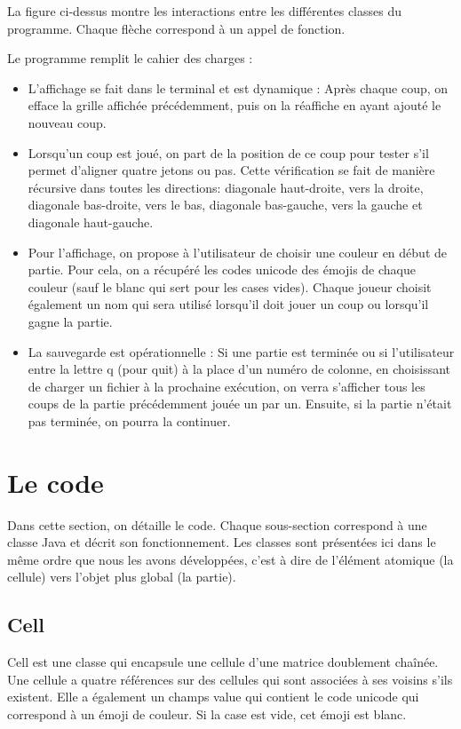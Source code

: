 \documentclass{article}
\begin{document}
La figure ci-dessus montre les interactions entre les différentes classes du programme. Chaque flèche correspond à un appel de
fonction.

Le programme remplit le cahier des charges :

\begin{itemize}
  \item L'affichage se fait dans le terminal et est dynamique :
  Après chaque coup, on efface la grille affichée précédemment, puis on la réaffiche en ayant ajouté le nouveau coup.
  \item Lorsqu'un coup est joué, on part de la position de ce coup pour tester s'il permet d'aligner quatre jetons ou pas. Cette
  vérification se fait de manière récursive dans toutes les directions: diagonale haut-droite, vers la droite, diagonale bas-droite, 
  vers le bas, diagonale bas-gauche, vers la gauche et diagonale haut-gauche.
  \item Pour l'affichage, on propose à l'utilisateur de choisir une couleur en début de partie. Pour cela, on a récupéré les codes
  unicode des émojis de chaque couleur (sauf le blanc qui sert pour les cases vides). Chaque joueur choisit également un nom qui
  sera utilisé lorsqu'il doit jouer un coup ou lorsqu'il gagne la partie.
  \item La sauvegarde est opérationnelle : Si une partie est terminée ou si l'utilisateur entre la lettre q (pour quit) à la place
  d'un numéro de colonne, en choisissant de charger un fichier à la prochaine exécution, on verra s'afficher tous les coups de la partie
  précédemment jouée un par un. Ensuite, si la partie n'était pas terminée, on pourra la continuer.
\end{itemize}

\section{Le code}

Dans cette section, on détaille le code. Chaque sous-section correspond à une classe Java et décrit son fonctionnement. Les classes
sont présentées ici dans le même ordre que nous les avons développées, c'est à dire de l'élément atomique (la cellule) vers l'objet
plus global (la partie).

\subsection{Cell}

Cell est une classe qui encapsule une cellule d'une matrice doublement chaînée. Une cellule a quatre références sur des cellules qui
sont associées à ses voisins s'ils existent. Elle a également un champs value qui contient le code unicode qui correspond à un émoji
de couleur. Si la case est vide, cet émoji est blanc.
\end{document}
